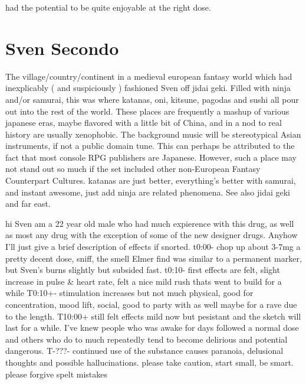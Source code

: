 \documentclass[12pt]{book}
\begin{document}
had the potential to be quite enjoyable at the right dose.



\chapter{Sven Secondo}

The village/country/continent in a medieval european fantasy world which had inexplicably ( and suspiciously ) fashioned Sven off jidai geki. Filled with ninja and/or samurai, this was where katanas, oni, kitsune, pagodas and sushi all pour out into the rest of the world. These places are frequently a mashup of various japanese eras, maybe flavored with a little bit of China, and  in a nod to real history  are usually xenophobic. The background music will be stereotypical Asian instruments, if not a public domain tune. This can perhaps be attributed to the fact that most console RPG publishers are Japanese. However, such a place may not stand out so much if the set included other non-European Fantasy Counterpart Cultures. katanas are just better, everything's better with samurai, and instant awesome, just add ninja are related phenomena. See also jidai geki and far east.



hi Sven am a 22 year old male who had much expierence with this drug, as well as most any drug with the exception of some of the new designer drugs. Anyhow I'll just give a brief description of effects if snorted. t0:00- chop up about 3-7mg a pretty decent dose, sniff, the smell Elmer find was similar to a permanent marker, but Sven's burns slightly but subsided fast. t0:10- first effects are felt, slight increase in pulse \& heart rate, felt a nice mild rush thats went to build for a while T0:10+- stimulation increases but not much physical, good for concentration, mood lift, social, good to party with as well maybe for a rave due to the length. T10:00+ still felt effects mild now but pesistant and the sketch will last for a while. I've knew people who was awake for days followed a normal dose and others who do to much repeatedly tend to become delirious and potential dangerous. T-???- continued use of the substance causes paranoia, delusional thoughts and possible hallucinations. please take caution, start small, be smart. please forgive spelt mistakes
\end{document}
